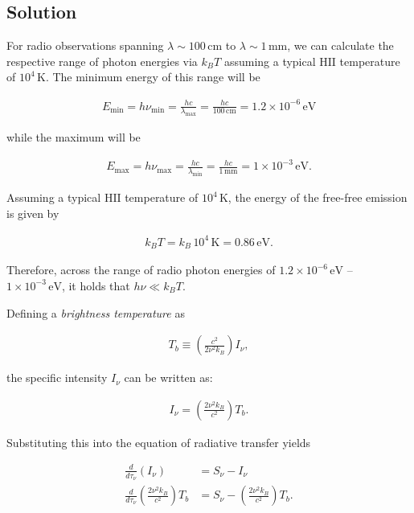 \documentclass[12pt]{article}
\begin{document}
\subsection*{Solution}

For radio observations spanning $\lambda \sim 100\,\mathrm{cm}$ to $\lambda \sim 1\,\mathrm{mm}$, we can calculate the respective range of photon energies via $k_BT$ assuming a typical $\mathrm{HII}$ temperature of $10^4\,\mathrm{K}$. The minimum energy of this range will be 

\begin{align*}
    E_\mathrm{min} = h\nu_\mathrm{min} = \frac{hc}{\lambda_\mathrm{max}} = \frac{hc}{100\,\mathrm{cm}} = 1.2\times10^{-6}\,\mathrm{eV}
\end{align*}

{\noindent}while the maximum will be

\begin{align*}
    E_\mathrm{max} = h\nu_\mathrm{max} = \frac{hc}{\lambda_\mathrm{min}} = \frac{hc}{1\,\mathrm{mm}} = 1\times10^{-3}\,\mathrm{eV}.
\end{align*}

{\noindent}Assuming a typical $\mathrm{HII}$ temperature of $10^4\,\mathrm{K}$, the energy of the free-free emission is given by

\begin{align*}
    k_BT = k_B\,10^4\,\mathrm{K} = 0.86\,\mathrm{eV}.
\end{align*}

{\noindent}Therefore, across the range of radio photon energies of $1.2\times10^{-6}\,\mathrm{eV}$ -- $1\times10^{-3}\,\mathrm{eV}$, it holds that $h\nu \ll k_BT$.

Defining a \textit{brightness temperature} as 

\begin{align*}
    T_b \equiv \left( \frac{c^2}{2\nu^2k_B} \right) I_\nu,
\end{align*}

{\noindent}the specific intensity $I_\nu$ can be written as:

\begin{align*}
    I_\nu = \left( \frac{2\nu^2k_B}{c^2} \right) T_b.
\end{align*}

{\noindent}Substituting this into the equation of radiative transfer yields

\begin{equation*}
\begin{split}
    \frac{d}{d\tau_\nu} (I_\nu) &= S_\nu - I_\nu \\
    \frac{d}{d\tau_\nu} \left( \frac{2\nu^2k_B}{c^2} \right) T_b &= S_\nu - \left( \frac{2\nu^2k_B}{c^2} \right) T_b.
\end{split}
\end{equation*}
\end{document}
